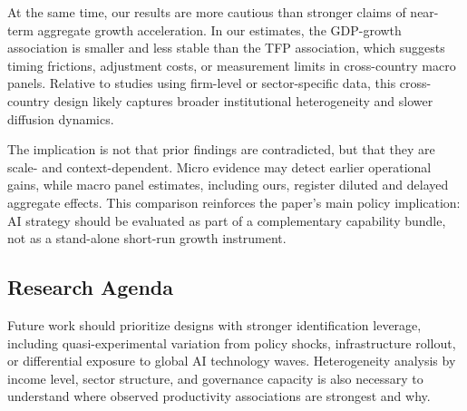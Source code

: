 At the same time, our results are more cautious than stronger claims of near-term aggregate growth acceleration. In our estimates, the GDP-growth association is smaller and less stable than the TFP association, which suggests timing frictions, adjustment costs, or measurement limits in cross-country macro panels. Relative to studies using firm-level or sector-specific data, this cross-country design likely captures broader institutional heterogeneity and slower diffusion dynamics.

The implication is not that prior findings are contradicted, but that they are scale- and context-dependent. Micro evidence may detect earlier operational gains, while macro panel estimates, including ours, register diluted and delayed aggregate effects. This comparison reinforces the paper's main policy implication: AI strategy should be evaluated as part of a complementary capability bundle, not as a stand-alone short-run growth instrument.

\subsection{Research Agenda}

Future work should prioritize designs with stronger identification leverage, including quasi-experimental variation from policy shocks, infrastructure rollout, or differential exposure to global AI technology waves. Heterogeneity analysis by income level, sector structure, and governance capacity is also necessary to understand where observed productivity associations are strongest and why.
